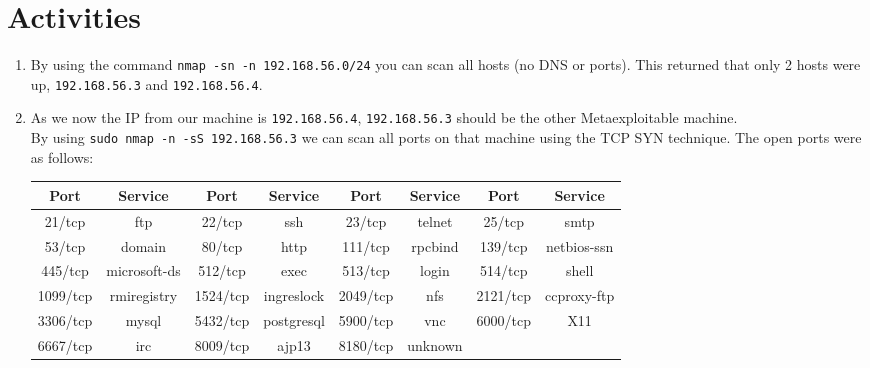 \section*{Activities}
\begin{enumerate}
    \item By using the command \texttt{nmap -sn -n 192.168.56.0/24} you can scan all hosts (no DNS or ports). This returned that only 2 hosts were up, \texttt{192.168.56.3} and \texttt{192.168.56.4}.
    \item As we now the IP from our machine is \texttt{192.168.56.4}, \texttt{192.168.56.3} should be the other Metaexploitable machine.\\
    By using \texttt{sudo nmap -n -sS 192.168.56.3} we can scan all ports on that machine using the TCP SYN technique. The open ports were as follows:\\
    \begin{table}[!h]
        \centering
        \begin{tabular}{|c|c||c|c||c|c||c|c|}
        \hline
        \textbf{Port} & \textbf{Service} & \textbf{Port} & \textbf{Service} & \textbf{Port} & \textbf{Service} & \textbf{Port} & \textbf{Service} \\ \hline
        21/tcp        & ftp              & 22/tcp        & ssh              & 23/tcp        & telnet           & 25/tcp        & smtp             \\ \hline
        53/tcp        & domain           & 80/tcp        & http             & 111/tcp       & rpcbind          & 139/tcp       & netbios-ssn      \\ \hline
        445/tcp       & microsoft-ds     & 512/tcp       & exec             & 513/tcp       & login            & 514/tcp       & shell            \\ \hline
        1099/tcp      & rmiregistry      & 1524/tcp      & ingreslock       & 2049/tcp      & nfs              & 2121/tcp      & ccproxy-ftp      \\ \hline
        3306/tcp      & mysql            & 5432/tcp      & postgresql       & 5900/tcp      & vnc              & 6000/tcp      & X11              \\ \hline
        6667/tcp      & irc              & 8009/tcp      & ajp13            & 8180/tcp      & unknown          &               &                  \\ \hline
        \end{tabular}
    \end{table}


\end{enumerate}
